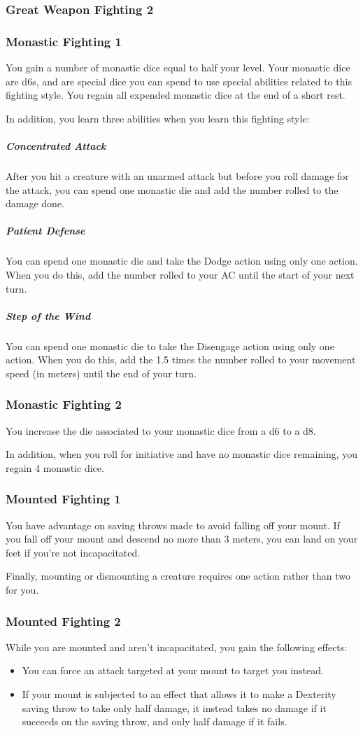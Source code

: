 \subsubsection{Great Weapon Fighting 2}
\subsubsection{Monastic Fighting 1}
    You gain a number of monastic dice equal to half your level.
    Your monastic dice are d6s, and are special dice you can spend to use special abilities related to this fighting style.
    You regain all expended monastic dice at the end of a short rest.

    In addition, you learn three abilities when you learn this fighting style:
    \subparagraph{Concentrated Attack} After you hit a creature with an unarmed attack but before you roll damage for the attack, you can spend one monastic die and add the number rolled to the damage done.
    \subparagraph{Patient Defense} You can spend one monastic die and take the Dodge action using only one action.
    When you do this, add the number rolled to your AC until the start of your next turn.
    \subparagraph{Step of the Wind} You can spend one monastic die to take the Disengage action using only one action.
    When you do this, add the 1.5 times the number rolled to your movement speed (in meters) until the end of your turn.
\subsubsection{Monastic Fighting 2}
    You increase the die associated to your monastic dice from a d6 to a d8.

    In addition, when you roll for initiative and have no monastic dice remaining, you regain 4 monastic dice.
\subsubsection{Mounted Fighting 1}
    You have advantage on saving throws made to avoid falling off your mount.
    If you fall off your mount and descend no more than 3 meters, you can land on your feet if you're not incapacitated.

    Finally, mounting or dismounting a creature requires one action rather than two for you.
\subsubsection{Mounted Fighting 2}
    While you are mounted and aren't incapacitated, you gain the following effects:
    \begin{itemize}
        \item You can force an attack targeted at your mount to target you instead.
        \item If your mount is subjected to an effect that allows it to make a Dexterity saving throw to take only half damage, it instead takes no damage if it succeeds on the saving throw, and only half damage if it fails.
    \end{itemize}
